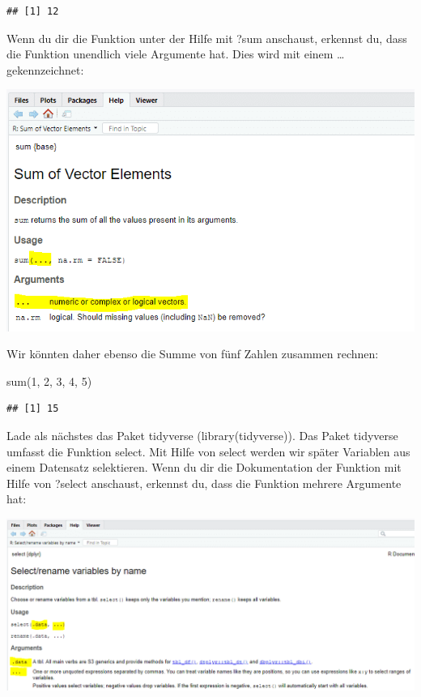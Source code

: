 \documentclass[
]{book}
\newenvironment{Shaded}{\begin{snugshade}}{\end{snugshade}}
\newcommand{\DecValTok}[1]{\textcolor[rgb]{0.00,0.00,0.81}{#1}}
\newcommand{\FunctionTok}[1]{\textcolor[rgb]{0.00,0.00,0.00}{#1}}
\newcommand{\NormalTok}[1]{#1}
\begin{document}
\begin{verbatim}
## [1] 12
\end{verbatim}

Wenn du dir die Funktion unter der Hilfe mit ?sum anschaust, erkennst du, dass die Funktion unendlich viele Argumente hat. Dies wird mit einem \ldots{} gekennzeichnet:

\includegraphics{images/02_grundlagen/sum.png}

Wir könnten daher ebenso die Summe von fünf Zahlen zusammen rechnen:

\begin{Shaded}
\begin{Highlighting}[]
\FunctionTok{sum}\NormalTok{(}\DecValTok{1}\NormalTok{, }\DecValTok{2}\NormalTok{, }\DecValTok{3}\NormalTok{, }\DecValTok{4}\NormalTok{, }\DecValTok{5}\NormalTok{)}
\end{Highlighting}
\end{Shaded}

\begin{verbatim}
## [1] 15
\end{verbatim}

Lade als nächstes das Paket tidyverse (library(tidyverse)). Das Paket tidyverse umfasst die Funktion select. Mit Hilfe von select werden wir später Variablen aus einem Datensatz selektieren. Wenn du dir die Dokumentation der Funktion mit Hilfe von ?select anschaust, erkennst du, dass die Funktion mehrere Argumente hat:

\includegraphics{images/02_grundlagen/select.png}
\end{document}
